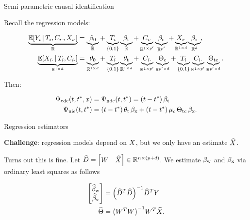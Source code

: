 \documentclass{beamer}
\theoremstyle{remark}
\begin{document}
\begin{frame}{Semi-parametric causal identification}

    Recall the regression models:

    \begin{equation*}
        \begin{aligned}
            \underbrace{\E[T_i, \C_{i \cdot}, \X_{i \cdot}]{Y_i}}_{\R}
             & = \underbrace{\betazero}_{\R}
            + \underbrace{T_i}_{\{0, 1\}} \underbrace{\betat}_{\R}
            + \underbrace{\C_{i \cdot}}_{\R^{1 \times p'}} \underbrace{\betac}_{\R^{p'}}
            + \underbrace{\X_{i \cdot}}_{\R^{1 \times d}} \underbrace{\betax}_{\R^d}, \\
            \underbrace{\E[T_i, \C_{i \cdot}]{\X_{i \cdot}}}_{\R^{1 \times d}}
             & = \underbrace{\thetazero}_{\R^{1 \times d}}
            + \underbrace{T_i}_{\{0, 1\}} \underbrace{\thetat}_{\R^{1 \times d}}
            + \underbrace{\C_{i \cdot}}_{\R^{1 \times p'}} \underbrace{\Thetac}_{\R^{p' \times d}}
            + \underbrace{T_i}_{\{0, 1\}} \underbrace{\C_{i \cdot}}_{\R^{1 \times p'}} \underbrace{\Thetatc}_{\R^{p' \times d}}.
        \end{aligned}
    \end{equation*}

    Then:

    \begin{align*}
        \cdef & = \ndef = \paren*{t - t^*} \, \betat                                                \\
        \nief & = \paren*{t - t^*} \, \thetat \, \betax + (t - t^*) \, \mu_c \, \Thetatc \, \betax.
    \end{align*}

\end{frame}


\begin{frame}{Regression estimators}

    \textbf{Challenge}: regression models depend on $X$, but we only have an estimate $\widehat{X}$.

    \vspace{3mm}

    Turns out this is fine. Let $\widehat{D} = \begin{bmatrix} W & \widehat{X} \end{bmatrix} \in \mathbb{R}^{n \times (p + d)}$. We estimate $\beta_\text{w}$ and $\beta_\text{x}$ via ordinary least squares as follows

    \begin{align*}
        \begin{bmatrix}
            \betawhat \\
            \betaxhat
        \end{bmatrix}
         & = \paren*{\Dhat^T \Dhat}^{-1} \Dhat^T Y \\
        \Thetahat
         & = \paren*{\W^T \W}^{-1} \W^T \Xhat.
    \end{align*}
\end{frame}
\end{document}
